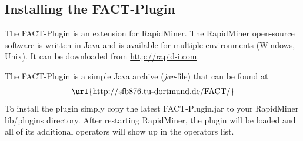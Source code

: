 \subsection*{Installing the FACT-Plugin}
The FACT-Plugin is an extension for RapidMiner. The RapidMiner
open-source software is written in Java and is available for multiple
environments (Windows, Unix). It can be downloaded from
\url{http://rapid-i.com}.

The FACT-Plugin is a simple Java archive ({\em jar}-file) that can be
found at
\begin{displaymath}
 \mbox{\url{http://sfb876.tu-dortmund.de/FACT/}}
\end{displaymath}
To install the plugin simply copy the latest {\ttfamily FACT-Plugin.jar}
to your RapidMiner {\ttfamily lib/plugins} directory. After restarting
RapidMiner, the plugin will be loaded and all of its additional operators
will show up in the operators list.



